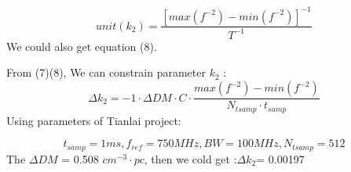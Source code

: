 \documentclass{article}
\begin{document}
{\centering \[unit(k_2)=\frac{[max(f^{-2})-min(f^{-2})]^{-1}}{T^{-1}} \]}
We could also get equation (8).
\pagebreak

From (7)(8), We can constrain parameter $k_2$  :
\begin{equation}
\Delta k_2 = -1 \cdot \Delta DM \cdot C \cdot \frac{max(f^{-2})-min(f^{-2})}{N_{tsamp}\cdot t_{samp}}
\end{equation}
Using parameters of Tianlai project:

{\center \[t_{samp} =1 ms, f_{ref}=750 MHz , BW = 100 MHz , N_{tsamp}=512\]}
The $\Delta DM$ = 0.508 $cm^{-3}\cdot pc$, then we cold get :$\Delta k_2$= 0.00197
\end{document}
